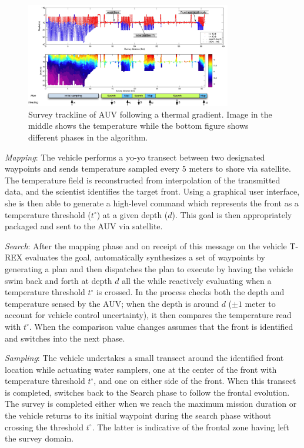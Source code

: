 \begin{figure}[htpb]
\centering
\includegraphics[width=0.8\textwidth]{figs/front-mi.jpg}
\caption{\small{Survey trackline of AUV following a thermal
    gradient. Image in the middle shows the temperature while the
    bottom figure shows different phases in the algorithm.}}
\label{fig:mi-front}
\end{figure}

\emph{Mapping}: The vehicle performs a yo-yo transect between two
designated waypoints and sends temperature sampled every $5$ meters to
shore via satellite. The temperature field is reconstructed from
interpolation of the transmitted data, and the scientist identifies
the target front. Using a graphical user interface, she is then able
to generate a high-level command which represents the front as a
temperature threshold ($t^{\circ}$) at a given depth ($d$). This goal is
then appropriately packaged and sent to the AUV via satellite.

\emph{Search}: After the mapping phase and on receipt of this message
on the vehicle T-REX evaluates the goal, automatically synthesizes a
set of waypoints by generating a plan and then dispatches the plan to
execute by having the vehicle swim back and forth at depth $d$ all the
while reactively evaluating when a temperature threshold $t^{\circ}$
is crossed. In the process \rx checks both the depth and temperature
sensed by the AUV; when the depth is around $d$ ($\pm 1$ meter to
account for vehicle control uncertainty), it then compares the
temperature read with $t^{\circ}$. When the comparison value changes \rx
assumes that the front is identified and switches into the next phase.

\emph{Sampling}: The vehicle undertakes a small transect around the
identified front location while actuating water samplers, one at the
center of the front with temperature threshold $t^{\circ}$, and one on
either side of the front. When this transect is completed, \rx
switches back to the Search phase to follow the frontal evolution.
The survey is completed either when we reach the maximum mission
duration or the vehicle returns to its initial waypoint during the
search phase without crossing the threshold $t^{\circ}$. The latter is
indicative of the frontal zone having left the survey domain.


